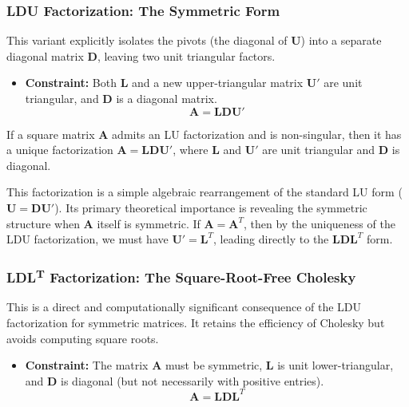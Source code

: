 \subsubsection{LDU Factorization: The Symmetric Form}
This variant explicitly isolates the pivots (the diagonal of $\mathbf{U}$) into a separate diagonal matrix $\mathbf{D}$, leaving two unit triangular factors.

\begin{itemize}
    \item \textbf{Constraint:} Both $\mathbf{L}$ and a new upper-triangular matrix $\mathbf{U}'$ are unit triangular, and $\mathbf{D}$ is a diagonal matrix.
    \[ \mathbf{A} = \mathbf{L}\mathbf{D}\mathbf{U}' \]
\end{itemize}

\begin{theorem}
If a square matrix $\mathbf{A}$ admits an LU factorization and is non-singular, then it has a unique factorization $\mathbf{A} = \mathbf{L}\mathbf{D}\mathbf{U}'$, where $\mathbf{L}$ and $\mathbf{U}'$ are unit triangular and $\mathbf{D}$ is diagonal.
\end{theorem}

\begin{remark}
This factorization is a simple algebraic rearrangement of the standard LU form ($\mathbf{U} = \mathbf{D}\mathbf{U}'$). Its primary theoretical importance is revealing the symmetric structure when $\mathbf{A}$ itself is symmetric. If $\mathbf{A} = \mathbf{A}^T$, then by the uniqueness of the LDU factorization, we must have $\mathbf{U}' = \mathbf{L}^T$, leading directly to the $\mathbf{L}\mathbf{D}\mathbf{L}^T$ form.
\end{remark}

\subsubsection{LDL\textsuperscript{T} Factorization: The Square-Root-Free Cholesky}
This is a direct and computationally significant consequence of the LDU factorization for symmetric matrices. It retains the efficiency of Cholesky but avoids computing square roots.

\begin{itemize}
    \item \textbf{Constraint:} The matrix $\mathbf{A}$ must be symmetric, $\mathbf{L}$ is unit lower-triangular, and $\mathbf{D}$ is diagonal (but not necessarily with positive entries).
    \[ \mathbf{A} = \mathbf{L}\mathbf{D}\mathbf{L}^T \]
\end{itemize}

